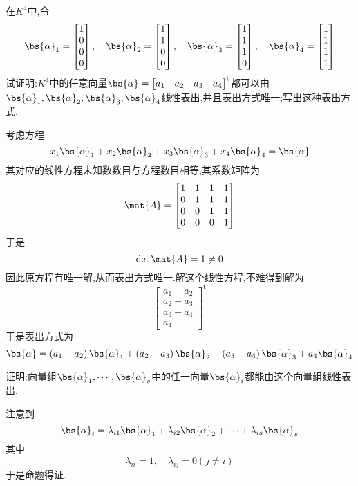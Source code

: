 \documentclass{ctexart}
\begin{document}
\begin{homework}[5]
    在$K^4$中,令
    \[\bs{\alpha}_1=\begin{bmatrix}
        1\\0\\0\\0
    \end{bmatrix},\quad\bs{\alpha}_2=\begin{bmatrix}
        1\\1\\0\\0
    \end{bmatrix},\quad\bs{\alpha}_3=\begin{bmatrix}
        1\\1\\1\\0
    \end{bmatrix},\quad\bs{\alpha}_4=\begin{bmatrix}
        1\\1\\1\\1
    \end{bmatrix}\]
    试证明:$K^4$中的任意向量$\bs{\alpha}=\begin{bmatrix}
        a_1&a_2&a_3&a_4
    \end{bmatrix}^{\text{t}}$都可以由$\bs{\alpha}_1,\bs{\alpha}_2,\bs{\alpha}_3,\bs{\alpha}_4$线性表出,并且表出方式唯一;写出这种表出方式.
\end{homework}
\begin{solution}
    考虑方程
    \[x_1\bs{\alpha}_1+x_2\bs{\alpha}_2+x_3\bs{\alpha}_3+x_4\bs{\alpha}_4=\bs{\alpha}\]
    其对应的线性方程未知数数目与方程数目相等,其系数矩阵为
    \[\mat{A}=\begin{bmatrix}
        1&1&1&1\\
        0&1&1&1\\
        0&0&1&1\\
        0&0&0&1
    \end{bmatrix}\]
    于是
    \[\det\mat{A}=1\neq0\]
    因此原方程有唯一解,从而表出方式唯一.解这个线性方程,不难得到解为
    \[\begin{bmatrix}
        a_1-a_2\\a_2-a_3\\a_3-a_4\\a_4
    \end{bmatrix}^{\text{t}}\]
    于是表出方式为
    \[\bs{\alpha}=\left(a_1-a_2\right)\bs{\alpha}_1+\left(a_2-a_3\right)\bs{\alpha}_2+\left(a_3-a_4\right)\bs{\alpha}_3+a_4\bs{\alpha}_4\]
\end{solution}
\begin{homework}[6]
    证明:向量组$\bs{\alpha}_1,\cdots,\bs{\alpha}_s$中的任一向量$\bs{\alpha}_i$都能由这个向量组线性表出.
\end{homework}
\begin{solution}
    注意到
    \[\bs{\alpha}_i=\lambda_{i1}\bs{\alpha}_1+\lambda_{i2}\bs{\alpha}_2+\cdots+\lambda_{is}\bs{\alpha}_s\]
    其中
    \[\lambda_{ii}=1,\quad\lambda_{ij}=0(j\neq i)\]
    于是命题得证.
\end{solution}
\end{document}
